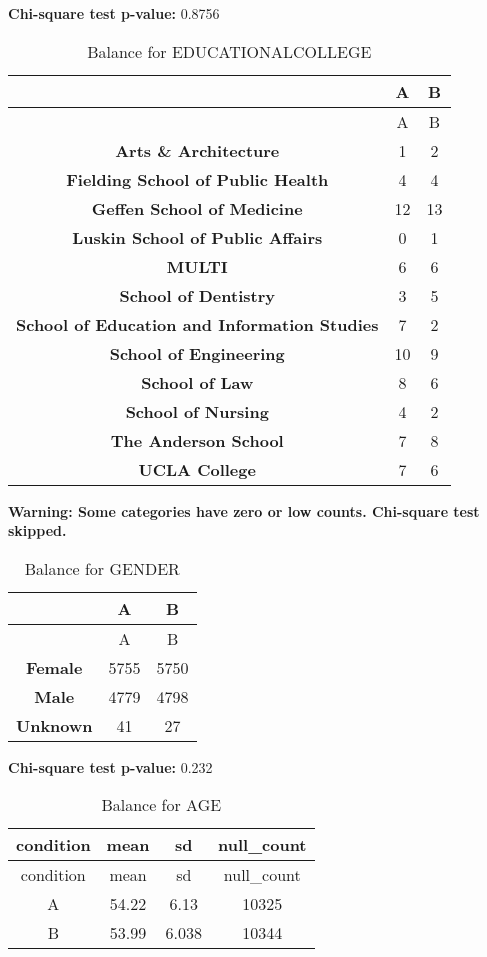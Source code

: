 \documentclass[
]{article}
\begin{document}
\textbf{Chi-square test p-value:} 0.8756\\
\pagebreak

\begin{longtable}[]{@{}ccc@{}}
\caption{Balance for EDUCATIONALCOLLEGE}\tabularnewline
\toprule\noalign{}
~ & A & B \\
\midrule\noalign{}
\endfirsthead
\toprule\noalign{}
~ & A & B \\
\midrule\noalign{}
\endhead
\bottomrule\noalign{}
\endlastfoot
\textbf{Arts \& Architecture} & 1 & 2 \\
\textbf{Fielding School of Public Health} & 4 & 4 \\
\textbf{Geffen School of Medicine} & 12 & 13 \\
\textbf{Luskin School of Public Affairs} & 0 & 1 \\
\textbf{MULTI} & 6 & 6 \\
\textbf{School of Dentistry} & 3 & 5 \\
\textbf{School of Education and Information Studies} & 7 & 2 \\
\textbf{School of Engineering} & 10 & 9 \\
\textbf{School of Law} & 8 & 6 \\
\textbf{School of Nursing} & 4 & 2 \\
\textbf{The Anderson School} & 7 & 8 \\
\textbf{UCLA College} & 7 & 6 \\
\end{longtable}

\textbf{Warning: Some categories have zero or low counts. Chi-square
test skipped.} \pagebreak

\begin{longtable}[]{@{}ccc@{}}
\caption{Balance for GENDER}\tabularnewline
\toprule\noalign{}
~ & A & B \\
\midrule\noalign{}
\endfirsthead
\toprule\noalign{}
~ & A & B \\
\midrule\noalign{}
\endhead
\bottomrule\noalign{}
\endlastfoot
\textbf{Female} & 5755 & 5750 \\
\textbf{Male} & 4779 & 4798 \\
\textbf{Unknown} & 41 & 27 \\
\end{longtable}

\textbf{Chi-square test p-value:} 0.232\\
\pagebreak

\begin{longtable}[]{@{}cccc@{}}
\caption{Balance for AGE}\tabularnewline
\toprule\noalign{}
condition & mean & sd & null\_count \\
\midrule\noalign{}
\endfirsthead
\toprule\noalign{}
condition & mean & sd & null\_count \\
\midrule\noalign{}
\endhead
\bottomrule\noalign{}
\endlastfoot
A & 54.22 & 6.13 & 10325 \\
B & 53.99 & 6.038 & 10344 \\
\end{longtable}
\end{document}
